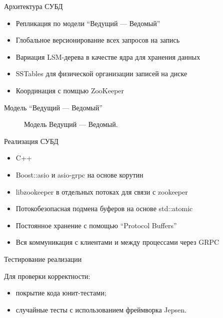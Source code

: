 \documentclass{beamer}
\begin{document}
\begin{frame}{Архитектура СУБД}
  \begin{alertblock}{}
    \begin{itemize}
      \item Репликация по модели ``Ведущий --- Ведомый''
      \item Глобальное версионирование всех запросов на запись
      \item Вариация LSM-дерева в качестве ядра для хранения данных
      \item SSTables для физической организации записей на диске
      \item Координация с помщью ZooKeeper
    \end{itemize}
  \end{alertblock}
\end{frame}

\begin{frame}{Модель ``Ведущий --- Ведомый''}
\begin{figure}[H]
  \centering
  \begin{minipage}[t]{\textwidth}
    \centering
    
  \end{minipage}
  \caption{Модель Ведущий --- Ведомый.}
  \label{fig:master-follwer}
\end{figure}
\end{frame}

\begin{frame}{Реализация СУБД}
  \begin{alertblock}{}
    \begin{itemize}
      \item C++
      \item Boost::asio и asio-grpc на основе корутин
      \item libzookeeper в отдельных потоках для связи с zookeeper
      \item Потокобезопасная подмена буферов на основе std::atomic
      \item Постоянное хранение с помощью ``Protocol Buffers''
      \item Вся коммуникация с клиентами и между процессами через GRPC
    \end{itemize}
  \end{alertblock}
\end{frame}

\begin{frame}{Тестирование реализации}
  \begin{alertblock}{Для проверки корректности:}
  \begin{itemize}
    \item покрытие кода юнит-тестами;
    \item случайные тесты с использованием фреймворка Jepsen.
  \end{itemize}
  \end{alertblock}
\end{frame}
\end{document}
